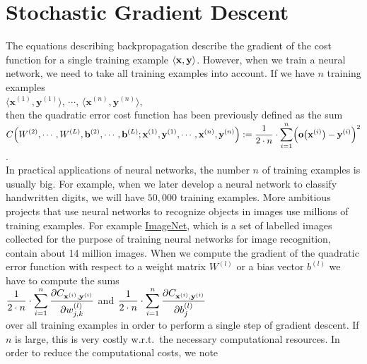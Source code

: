 \section{Stochastic Gradient Descent}
The equations describing backpropagation describe the gradient of the cost function for a single training
example $\pair(\mathbf{x}, \mathbf{y})$.  However, when we train a neural network, we need to take all training
examples into account.  If we have $n$ training examples
\\[0.2cm]
\hspace*{1.3cm}
$\langle\mathbf{x}^{(1)}, \mathbf{y}^{(1)}\rangle$,
$\cdots$,
$\langle\mathbf{x}^{(n)}, \mathbf{y}^{(n)}\rangle$,
\\[0.2cm]
then the quadratic error cost function has been previously defined as the sum
\\[0.2cm]
\hspace*{1.3cm}
$\displaystyle C\Bigr(W^{(2)}, \cdots, W^{(L)}, \mathbf{b}^{(2)}, \cdots, \mathbf{b}^{(L)};
     \mathbf{x}^{(1)}, \mathbf{y}^{(1)}, \cdots, \mathbf{x}^{(n)},\mathbf{y}^{(n)} \Bigr) := 
 \frac{1}{2 \cdot n} \cdot \sum\limits_{i=1}^n \Bigl(\mathbf{o}\bigl(\mathbf{x}^{(i)}\bigr) - \mathbf{y}^{(i)}\Bigr)^2
$.
\\[0.2cm]
In practical applications of neural networks, the number $n$ of training examples is usually big.  For example, 
when we later develop a neural network to classify handwritten digits, we will have $50,000$ training examples.  More
ambitious projects that use neural networks to recognize objects in images use millions of training examples.
For example \href{https://www.image-net.org/download.php}{ImageNet}, which is a set of labelled images
collected for the purpose of training neural networks for image recognition, contain about 14 million images.
When we compute the gradient of the quadratic error function with respect to a weight matrix $W^{(l)}$ or a
bias vector $b^{(l)}$ we have to compute the sums 
\\[0.2cm]
\hspace*{1.3cm}
$\displaystyle \frac{1}{2\cdot n} \cdot \sum\limits_{i=1}^n \frac{\partial C_{\mathbf{x}^{(i)}, \mathbf{y}^{(i)}}}{\partial w_{j,k}^{(l)}}$
\quad and \quad
$\displaystyle \frac{1}{2\cdot n} \cdot \sum\limits_{i=1}^n \frac{\partial C_{\mathbf{x}^{(i)}, \mathbf{y}^{(i)}}}{\partial b_{j}^{(l)}}$
\\[0.2cm]
over all training examples in order to perform a single step of gradient descent.  If $n$ is large, this is
very costly w.r.t.~the necessary computational resources.  In order to reduce the computational costs, we note
